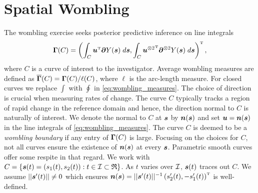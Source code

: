 

\section{Spatial Wombling}\label{sec:spatial_wombling}
The wombling exercise seeks posterior predictive inference on line integrals
\begin{equation}\label{eq:wombling_measures}
    \bGamma(C) = \left(\int_C \bu^{\T}\bpartial Y(\bs)\;d\bs, \int_C{\bu^{\otimes 2}}^{\T}\bpartial^{\otimes 2} Y(\bs)\;d\bs\right)^{\T},
\end{equation}
where $C$ is a curve of interest to the investigator. Average wombling measures are defined as $\overline{\bGamma}(C) = \bGamma(C)/\ell(C)$, where $\ell$ is the arc-length measure. For closed curves we replace $\int$ with $\oint$ in \ref{eq:wombling_measures}. The choice of direction is crucial when measuring rates of change. The curve $C$ typically tracks a region of rapid change in the reference domain and hence, the direction normal to $C$ is naturally of interest. We denote the normal to $C$ at $\bs$ by $\bn(\bs)$ and set $\bu = \bn(\bs)$ in the line integrals of \ref{eq:wombling_measures}. The curve $C$ is deemed to be a \emph{wombling boundary} if any entry of $\bGamma(C)$ is large. Focusing on the choices for $C$, not all curves ensure the existence of $\bn(\bs)$ at every $\bs$. Parametric smooth curves offer some respite in that regard. We work with $C = \{\bs(t) = (s_1(t), s_2(t)):t \in\I \subset \mathfrak{R}\}$. As $t$ varies over $\mathcal{I}$, $\bs(t)$ traces out $C$. We assume $||\bs'(t)||\ne0$ which ensures $\bn(\bs)=||\bs'(t)||^{-1}\left(s_2'(t), -s_1'(t)\right)^{\T}$ is well-defined. 

